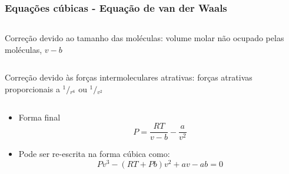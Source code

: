 \documentclass[aspectratio=169]{beamer}
\begin{document}
\begin{frame}
	\frametitle{Equações cúbicas - Equação de van der Waals}
	\begin{columns}
			\begin{exampleblock}{Correção devido ao tamanho das moléculas:}
				volume molar não ocupado pelas moléculas, $v-b$
			\end{exampleblock}
	\end{columns}
	\begin{columns}
		\column{.75\textwidth}
			\begin{exampleblock}{Correção devido às forças intermoleculares
			atrativas:}
			forças atrativas proporcionais a ${}^{1}/{}_{r^6}$ ou
			${}^{1}/{}_{v^2}$
			\end{exampleblock}
	\end{columns}
	\begin{itemize}
		\item Forma final
		\begin{equation*}
		P=\frac{RT}{v-b}-\frac{a}{v^2}
		\end{equation*}
		\item Pode ser re-escrita na forma cúbica como:
		\begin{equation*}
		Pv^3-\left(RT+Pb\right)v^2+av-ab=0
		\end{equation*}
	\end{itemize}
\end{frame}
\end{document}
